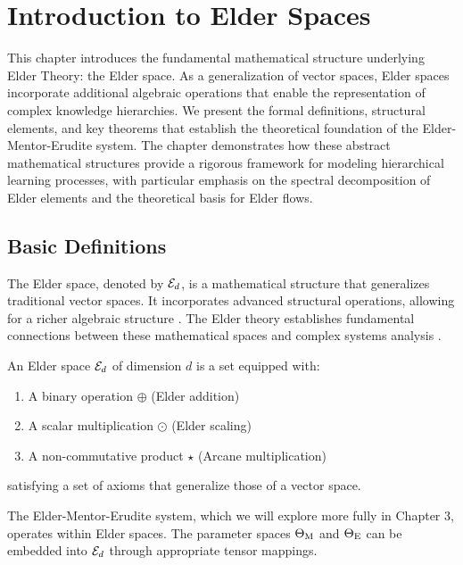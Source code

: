 \chapter{Introduction to Elder Spaces}

\begin{chapterabstract}
This chapter introduces the fundamental mathematical structure underlying Elder Theory: the Elder space. As a generalization of vector spaces, Elder spaces incorporate additional algebraic operations that enable the representation of complex knowledge hierarchies. We present the formal definitions, structural elements, and key theorems that establish the theoretical foundation of the Elder-Mentor-Erudite system. The chapter demonstrates how these abstract mathematical structures provide a rigorous framework for modeling hierarchical learning processes, with particular emphasis on the spectral decomposition of Elder elements and the theoretical basis for Elder flows.
\end{chapterabstract}

\section{Basic Definitions}

The Elder space, denoted by $\mathcal{E}_{d}$, is a mathematical structure that generalizes traditional vector spaces. It incorporates advanced structural operations, allowing for a richer algebraic structure \cite{elder_theory}. The Elder theory establishes fundamental connections between these mathematical spaces and complex systems analysis \cite{complex_mathematics}.

\begin{definition}
An Elder space $\mathcal{E}_{d}$ of dimension $d$ is a set equipped with:
\begin{enumerate}
    \item A binary operation $\oplus$ (Elder addition)
    \item A scalar multiplication $\odot$ (Elder scaling)
    \item A non-commutative product $\star$ (Arcane multiplication)
\end{enumerate}
satisfying a set of axioms that generalize those of a vector space.
\end{definition}

\begin{remark}
The Elder-Mentor-Erudite system, which we will explore more fully in Chapter 3, operates within Elder spaces. The parameter spaces $\Theta_{\text{M}}$ and $\Theta_{\text{E}}$ can be embedded into $\mathcal{E}_{d}$ through appropriate tensor mappings.
\end{remark}

